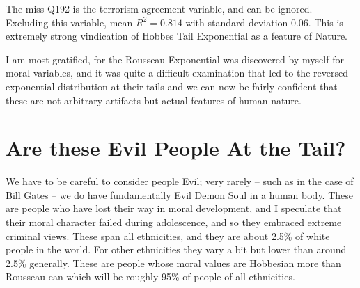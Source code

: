 \documentclass{amsart}
\begin{document}
The miss Q192 is the terrorism agreement variable, and can be ignored.    Excluding this variable, mean $R^2=0.814$ with standard deviation 0.06.  This is extremely strong vindication of Hobbes Tail Exponential as a feature of Nature.  

I am most gratified, for the Rousseau Exponential was discovered by myself for moral variables, and it was quite a difficult examination that led to the reversed exponential distribution at their tails and we can now be fairly confident that these are not arbitrary artifacts but actual features of human nature.

\section{Are these Evil People At the Tail?}

We have to be careful to consider people Evil; very rarely -- such as in the case of Bill Gates -- we do have fundamentally Evil Demon Soul in a human body.  These are people who have lost their way in moral development, and I speculate that their moral character failed during adolescence, and so they embraced extreme criminal views.  These span all ethnicities, and they are about 2.5\% of white people in the world.  For other ethnicities they vary a bit but lower than around 2.5\% generally.  These are people whose moral values are Hobbesian more than Rousseau-ean which will be roughly 95\% of people of all ethnicities.  
\end{document}
